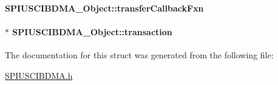 \paragraph[{transfer\+Callback\+Fxn}]{ S\+P\+I\+U\+S\+C\+I\+B\+D\+M\+A\+\_\+\+Object\+::transfer\+Callback\+Fxn}\label{struct_s_p_i_u_s_c_i_b_d_m_a___object_aa0f097248d6ba037d9c6fd40a0e13575}
\paragraph[{transaction}]{$\ast$ S\+P\+I\+U\+S\+C\+I\+B\+D\+M\+A\+\_\+\+Object\+::transaction}\label{struct_s_p_i_u_s_c_i_b_d_m_a___object_a5befed95856b2c43b79b6a8eb5c67b0d}


The documentation for this struct was generated from the following file\+:\begin{DoxyCompactItemize}
\item 
\hyperlink{_s_p_i_u_s_c_i_b_d_m_a_8h}{S\+P\+I\+U\+S\+C\+I\+B\+D\+M\+A.\+h}\end{DoxyCompactItemize}
